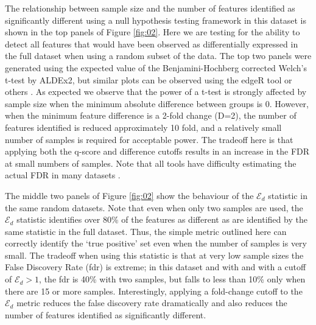 \documentclass{bioinfo}
\begin{document}
The relationship between sample size and the number of features identified as significantly different using a null hypothesis testing framework in this dataset is shown in the top  panels of Figure \ref{fig:02}.  Here we are testing for the ability to detect all features that would have been observed as differentially expressed in the full dataset when using a random subset of the data. The top two panels were generated using the expected value of the Benjamini-Hochberg corrected Welch's t-test by ALDEx2, but similar plots can be observed using the edgeR tool  or others \citep{Schurch:2016aa}. As expected we observe that the power of a t-test is strongly affected by sample size when the minimum absolute difference between groups is 0. However, when the minimum feature difference is a 2-fold change (D=2), the number of features identified is reduced approximately 10 fold, and a relatively small number of samples is required for acceptable power. The tradeoff here is that applying both the q-score and difference cutoffs results in an increase in the FDR at small numbers of samples. Note that all tools have difficulty estimating the actual FDR in many datasets \citep{Thorsen:2016aa,hawinkel2017}. 

The middle two panels of Figure \ref{fig:02} show the behaviour of the $\mathcal{E}_{d}$ statistic in the same random datasets. Note that even when only two samples are used, the $\mathcal{E}_{d}$ statistic identifies over 80\% of the features as different as are identified by the same statistic in the full dataset. Thus, the simple metric outlined here  can correctly identify the `true positive' set even when the number of samples is very small. The tradeoff when using this statistic is that at very low sample sizes the False Discovery Rate (fdr) is extreme; in this dataset and with and with a cutoff of $\mathcal{E}_{d} > 1$, the fdr is 40\% with two samples, but falls to less than 10\% only when there are 15 or more samples. Interestingly, applying a fold-change cutoff to the $\mathcal{E}_{d}$ metric reduces the false discovery rate dramatically and also reduces the number of features identified as significantly different. 
\end{document}
